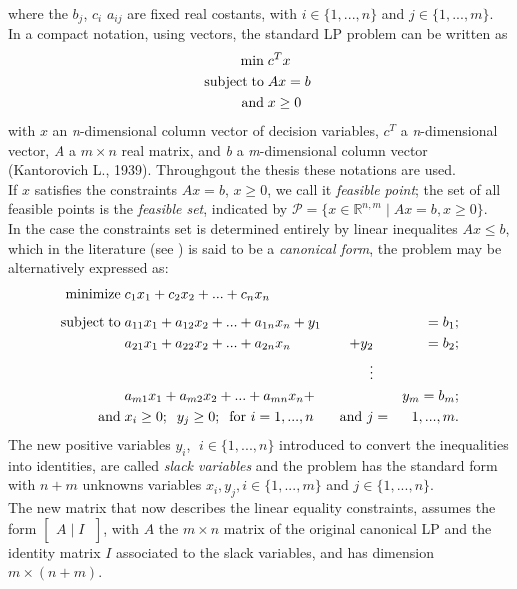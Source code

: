 \documentclass[a4paper,10 pt,titlepage,twoside]{book}
\theoremstyle{plain}
\theoremstyle{definition}
\theoremstyle{remark}
\begin{document}
where the $b_{j}$, $c_{i}$  $a_{ij}$ are fixed real costants, with $i \in\{1,...,n\}$ and $j\in\{1,...,m\}$.\\ In a compact notation, using vectors, the standard LP problem can be written as
\begin{equation}\label{(Prim)}
 \begin{split}
\min\;&c^{T}x\\
\text{subject\;to\;}&Ax= b\;\\\text{and\;}&x\geq0
 \end{split}
\end{equation}
with $x$ an \textit{n}-dimensional column vector of decision variables, $c^
{T}$ a \textit{n}-dimensional vector, \textit{A} a $m \times n$ real matrix, and \textit{b} a \textit{m}-dimensional column vector (Kantorovich L., 1939).
Throughgout the thesis these notations are used.\\
If $x$ satisfies the constraints $Ax = b$, $x\geq0$, we call it \textit{feasible point}; the set of all feasible points is the \textit{feasible set}, indicated by $\mathcal{P}=\lbrace x\in\mathbb{R}^{n,m}\; |\; Ax = b , x \geq0\rbrace$.\\
In the case the constraints set is determined entirely by linear inequalites $Ax \leq b$, which in the literature (see \cite{W}) is said to be a \textit{canonical form}, the problem may be alternatively expressed as:
\begin{alignat*}{3}
\text{minimize\;}&c_1 x_1 + c_2 x_2+ ...+c_n x_n&&&\\[1.8mm]
\text{subject\;to\;}&a_{11} x_1 +a_{12}x_2 + ... +a_{1n}x_n +y_{1}&&&= b_1;\\
		   	&a_{21}x_1+a_{22}x_2+ ... +a_{2n}x_n&+y_{2}&&= b_2;\\
&&\;\;\;\vdots&&\\
&a_{m1}x_1+a_{m2}x_2+ ... +a_{mn}x_n+&&&y_{m}=b_m;\\
\text{and} \;& x_{i} \geq 0;\;\; y_{j} \geq 0; \text{\;\;for }i = 1,...,n&\text{ and }j&=&1,...,m.
\end{alignat*}
The new positive variables $\mathit{y_{i}}$, $\;i \in \{1, ..., n\}$ introduced to convert the inequalities into identities, are called \textit{slack variables} and the problem has the standard form with $n+m$ unknowns variables $x_{i}, y_{j},i \in \{1, ..., m\}$ and $j \in \{1, ..., n\}.$\\ The new matrix that now describes the linear equality constraints, assumes the form $\left[\begin{matrix}A\;\vert\; I\;\end{matrix}\right]$, with $A$ the $m \times n$ matrix of the original canonical LP and the identity matrix $I$ associated to the slack variables, and has dimension $m \times (n + m)$.\\
\end{document}
